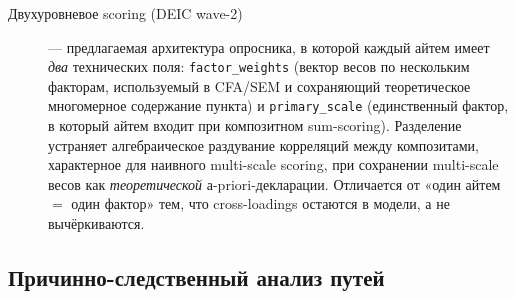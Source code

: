 \begin{description}
    \item[Двухуровневое scoring (DEIC wave-2)] --- предлагаемая архитектура опросника, в которой каждый айтем имеет \emph{два} технических поля: \texttt{factor\_weights} (вектор весов по нескольким факторам, используемый в CFA/SEM и сохраняющий теоретическое многомерное содержание пункта) и \texttt{primary\_scale} (единственный фактор, в который айтем входит при композитном sum-scoring). Разделение устраняет алгебраическое раздувание корреляций между композитами, характерное для наивного multi-scale scoring, при сохранении multi-scale весов как \emph{теоретической} а-priori-декларации. Отличается от «один айтем $=$ один фактор» тем, что cross-loadings остаются в модели, а не вычёркиваются.
\end{description}

\subsection*{Причинно-следственный анализ путей}

